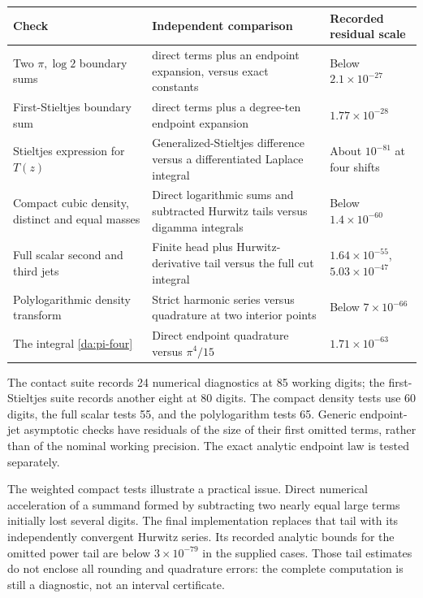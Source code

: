 \begin{center}
\small
\renewcommand{\arraystretch}{1.3}
\begin{tabular}{>{\raggedright\arraybackslash}p{}>{\raggedright\arraybackslash}p{}>{\raggedright\arraybackslash}p{}}
\toprule
Check & Independent comparison & Recorded residual scale\\
\midrule
Two \(\pi,\log2\) boundary sums &
257 direct terms plus an endpoint expansion, versus exact constants &
Below \(2.1\times10^{-27}\)\\
First-Stieltjes boundary sum &
257 direct terms plus a degree-ten endpoint expansion &
\(1.77\times10^{-28}\)\\
Stieltjes expression for \(T(z)\) &
Generalized-Stieltjes difference versus a differentiated Laplace integral &
About \(10^{-81}\) at four shifts\\
Compact cubic density, distinct and equal masses &
Direct logarithmic sums and subtracted Hurwitz tails versus digamma integrals &
Below \(1.4\times10^{-60}\)\\
Full scalar second and third jets &
Finite head plus Hurwitz-derivative tail versus the full cut integral &
\(1.64\times10^{-55}\), \(5.03\times10^{-47}\)\\
Polylogarithmic density transform &
Strict harmonic series versus quadrature at two interior points &
Below \(7\times10^{-66}\)\\
The integral \eqref{da:pi-four} &
Direct endpoint quadrature versus \(\pi^4/15\) &
\(1.71\times10^{-63}\)\\
\bottomrule
\end{tabular}
\end{center}

The contact suite records 24 numerical diagnostics at 85 working digits;
the first-Stieltjes suite records another eight at 80 digits. The compact
density tests use 60 digits, the full scalar tests 55, and the
polylogarithm tests 65. Generic endpoint-jet asymptotic checks have residuals
of the size of their first omitted terms, rather than of the nominal
working precision. The exact analytic endpoint law is tested separately.

The weighted compact tests illustrate a practical issue. Direct numerical
acceleration of a summand formed by subtracting two nearly equal large
terms initially lost several digits. The final implementation replaces that
tail with its independently convergent Hurwitz series. Its recorded
analytic bounds for the omitted power tail are below \(3\times10^{-79}\)
in the supplied cases. Those tail estimates do not enclose all rounding
and quadrature errors: the complete computation is still a diagnostic,
not an interval certificate.

